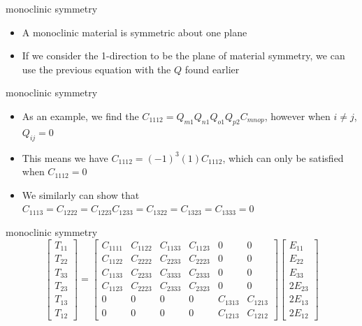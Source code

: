 \documentclass[
  letterpaper,
  ignorenonframetext,
  aspectratio=43,
  handout,
  12pt]{beamer}
\providecommand{\tightlist}{%
  \setlength{\itemsep}{0pt}\setlength{\parskip}{0pt}}
\providecommand{\tightlist}{%
\setlength{\itemsep}{0pt}\setlength{\parskip}{0pt}}
\begin{document}
\begin{frame}{monoclinic symmetry}
\protect\hypertarget{monoclinic-symmetry}{}
\begin{itemize}
\tightlist
\item
  A monoclinic material is symmetric about one plane
\item
  If we consider the 1-direction to be the plane of material symmetry,
  we can use the previous equation with the \(Q\) found earlier
\end{itemize}
\end{frame}

\begin{frame}{monoclinic symmetry}
\protect\hypertarget{monoclinic-symmetry-1}{}
\begin{itemize}
\tightlist
\item
  As an example, we find the
  \(C_{1112} = Q_{m1}Q_{n1}Q_{o1}Q_{p2}C_{mnop}\), however when
  \(i\ne j\), \(Q_{ij}=0\)
\item
  This means we have \(C_{1112} = (-1)^3(1) C_{1112}\), which can only
  be satisfied when \(C_{1112} = 0\)
\item
  We similarly can show that
  \(C_{1113} = C_{1222} = C_{1223} C_{1233} = C_{1322} = C_{1323} = C_{1333} =0\)
\end{itemize}
\end{frame}

\begin{frame}{monoclinic symmetry}
\protect\hypertarget{monoclinic-symmetry-2}{}
\[\begin{bmatrix}
    T_{11} \\ T_{22} \\ T_{33} \\ T_{23} \\ T_{13} \\ T_{12}
\end{bmatrix}
= \begin{bmatrix}
    C_{1111} & C_{1122} & C_{1133} & C_{1123} & 0 & 0 \\
    C_{1122} & C_{2222} & C_{2233} & C_{2223} & 0 & 0 \\
    C_{1133} & C_{2233} & C_{3333} & C_{2333} & 0 & 0 \\
    C_{1123} & C_{2223} & C_{2333} & C_{2323} & 0 & 0 \\
    0 & 0 & 0 & 0 & C_{1313} & C_{1213} \\
    0 & 0 & 0 & 0 & C_{1213} & C_{1212}
\end{bmatrix}\begin{bmatrix}
    E_{11} \\ E_{22} \\ E_{33} \\ 2E_{23} \\ 2E_{13} \\ 2E_{12}
\end{bmatrix}\]
\end{frame}
\end{document}
